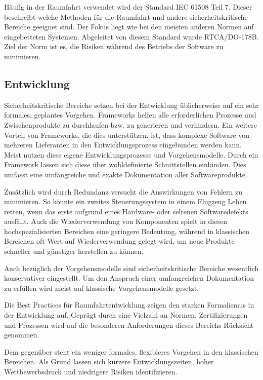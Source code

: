 Häufig in der Raumfahrt verwendet wird der Standard IEC 61508 Teil 7.
Dieser beschreibt welche Methoden für die Raumfahrt und andere sicherheitskritische Bereiche geeignet sind.
Der Fokus liegt wie bei den meisten anderen Normen auf eingebetteten Systemen.
Abgeleitet von diesem Standard wurde RTCA/DO-178B.
Ziel der Norm ist es, die Risiken während des Betriebs der Software zu minimieren.

\subsection{Entwicklung} %

Sicherheitskritische Bereiche setzen bei der Entwicklung üblicherweise auf ein sehr formales, geplantes Vorgehen.
Frameworks helfen alle erforderlichen Prozesse und Zwischenprodukte zu durchlaufen bzw. zu generieren und verhindern.
Ein weitere Vorteil von Frameworks, die dies unterstützen, ist, dass komplexe Software von mehreren Lieferanten in den Entwicklungsprozess eingebunden werden kann.
Meist nutzen diese eigene Entwicklungsprozesse und Vorgehensmodelle.
Durch ein Framework lassen sich diese über wohldefinierte Schnittstellen einbinden.
Dies umfasst eine umfangreiche und exakte Dokumentation aller Softwareprodukte.

Zusätzlich wird durch Redundanz versucht die Auswirkungen von Fehlern zu minimieren.
So könnte ein zweites Steuerungssystem in einem Flugzeug Leben retten, wenn das erste aufgrund eines Hardware- oder seltenen Softwaredefekts ausfällt.
Auch die Wiederverwendung von Komponenten spielt in diesen hochspezialisierten Bereichen eine geringere Bedeutung, während in klassischen Bereichen oft Wert auf Wiederverwendung gelegt wird, um neue Produkte schneller und günstiger herstellen zu können.
\parencite[Vgl.][S. 39]{Carpenter:2014aa}

Auch bezüglich der Vorgehensmodelle sind sicherheitskritische Bereiche wesentlich konservativer eingestellt.
Um den Anspruch einer umfangreichen Dokumentation zu erfüllen wird meist auf klassische Vorgehensmodelle gesetzt.
\parencite[Vgl.][S. 39]{Carpenter:2014aa}

Die Best Practices für Raumfahrtentwicklung \parencite[vgl.][]{Hersman:2010aa} zeigen den starken Formalismus in der Entwicklung auf.
Geprägt durch eine Vielzahl an Normen, Zertifizierungen und Prozessen wird auf die besonderen Anforderungen dieses Bereichs Rücksicht genommen.

Dem gegenüber steht ein weniger formales, flexibleres Vorgehen in den klassischen Bereichen. 
Als Grund lassen sich kürzere Entwicklungszeiten, hoher Wettbewerbsdruck und niedrigere Risiken identifizieren.


